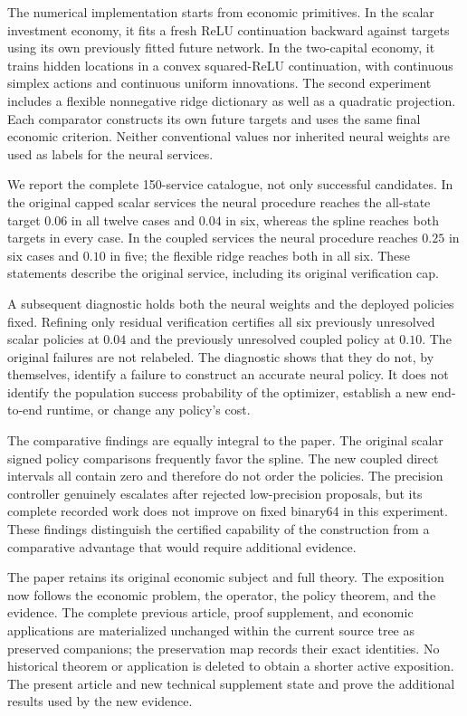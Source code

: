 \documentclass[ecta,nameyear,draft]{econsocart}
\begin{document}
The numerical implementation starts from economic primitives. In the scalar investment economy, it fits a fresh ReLU continuation backward against targets using its own previously fitted future network. In the two-capital economy, it trains hidden locations in a convex squared-ReLU continuation, with continuous simplex actions and continuous uniform innovations. The second experiment includes a flexible nonnegative ridge dictionary as well as a quadratic projection. Each comparator constructs its own future targets and uses the same final economic criterion. Neither conventional values nor inherited neural weights are used as labels for the neural services.

We report the complete 150-service catalogue, not only successful candidates. In the original capped scalar services the neural procedure reaches the all-state target $0.06$ in all twelve cases and $0.04$ in six, whereas the spline reaches both targets in every case. In the coupled services the neural procedure reaches $0.25$ in six cases and $0.10$ in five; the flexible ridge reaches both in all six. These statements describe the original service, including its original verification cap.

A subsequent diagnostic holds both the neural weights and the deployed policies fixed. Refining only residual verification certifies all six previously unresolved scalar policies at $0.04$ and the previously unresolved coupled policy at $0.10$. The original failures are not relabeled. The diagnostic shows that they do not, by themselves, identify a failure to construct an accurate neural policy. It does not identify the population success probability of the optimizer, establish a new end-to-end runtime, or change any policy's cost.

The comparative findings are equally integral to the paper. The original scalar signed policy comparisons frequently favor the spline. The new coupled direct intervals all contain zero and therefore do not order the policies. The precision controller genuinely escalates after rejected low-precision proposals, but its complete recorded work does not improve on fixed binary64 in this experiment. These findings distinguish the certified capability of the construction from a comparative advantage that would require additional evidence.

The paper retains its original economic subject and full theory. The exposition now follows the economic problem, the operator, the policy theorem, and the evidence. The complete previous article, proof supplement, and economic applications are materialized unchanged within the current source tree as preserved companions; the preservation map records their exact identities. No historical theorem or application is deleted to obtain a shorter active exposition. The present article and new technical supplement state and prove the additional results used by the new evidence.
\end{document}

